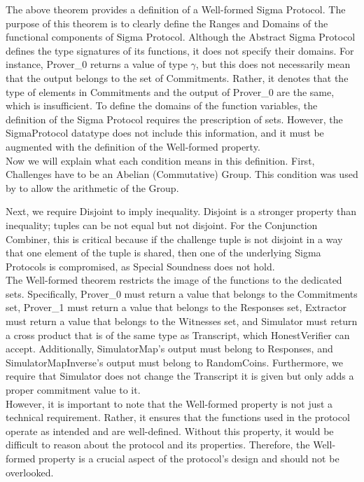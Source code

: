 \newpage

The above theorem provides a definition of a Well-formed Sigma Protocol. The purpose of this theorem is to clearly define the Ranges and Domains of the functional components of Sigma Protocol. 
Although the Abstract Sigma Protocol defines the type signatures of its functions, it does not specify their domains. 
For instance, Prover_0 returns a value of type $\gamma$, but this does not necessarily mean that the output belongs to the set of 
Commitments. Rather, it denotes that the type of elements in Commitments and the output of Prover_0 are the same, which is insufficient.
To define the domains of the function variables, the definition of the Sigma Protocol requires the prescription of sets. However, the 
SigmaProtocol datatype does not include this information, and it must be augmented with the definition of the Well-formed property.\\
Now we will explain what each condition means in this definition.
First, Challenges have to be an Abelian (Commutative) Group. This condition was used by \cite{Haines2019VerifiedVF} 
to allow the arithmetic of the Group.

Next, we require Disjoint to imply inequality. Disjoint is a stronger property than inequality; 
tuples can be not equal but not disjoint. For the Conjunction Combiner, 
this is critical because if the challenge tuple is not disjoint in a way that one element of the tuple is shared, 
then one of the underlying Sigma Protocols is compromised, as Special Soundness does not hold.\\
The Well-formed theorem restricts the image of the functions to the dedicated sets. Specifically, 
Prover_0 must return a value that belongs to the Commitments set, Prover_1 must return a value that belongs to the 
Responses set, Extractor must return a value that belongs to the Witnesses set, and Simulator must return a cross 
product that is of the same type as Transcript, which HonestVerifier can accept. Additionally, SimulatorMap's 
output must belong to Responses, and SimulatorMapInverse's output must belong to RandomCoins.
Furthermore, we require that Simulator does not change the Transcript it is given but only adds a proper commitment value to it.\\
However, it is important to note that the Well-formed property is not just a technical requirement. Rather, it ensures that the 
functions used in the protocol operate as intended and are well-defined. Without this property, it would be difficult to reason 
about the protocol and its properties. Therefore, the Well-formed property is a crucial aspect of the protocol's 
design and should not be overlooked.
